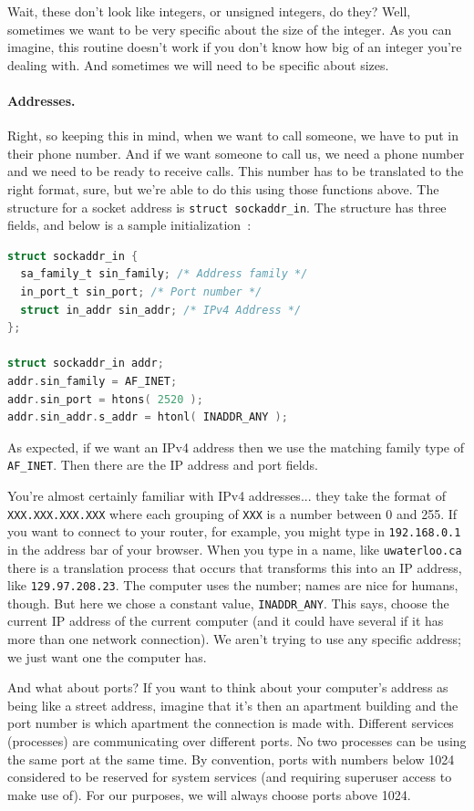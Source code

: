 \documentclass[a4paper]{report}
\begin{document}
Wait, these don't look like integers, or unsigned integers, do they? Well, sometimes we want to be very specific about the size of the integer. As you can imagine, this routine doesn't work if you don't know how big of an integer you're dealing with. And sometimes we will need to be specific about sizes.

\paragraph{Addresses.} Right, so keeping this in mind, when we want to call someone, we have to put in their phone number. And if we want someone to call us, we need a phone number and we need to be ready to receive calls. This number has to be translated to the right format, sure, but we're able to do this using those functions above. The structure for a socket address is \texttt{struct sockaddr\_in}. The structure has three fields, and below is a sample initialization~\cite{apunix}:

\begin{lstlisting}[language=C]
struct sockaddr_in {
  sa_family_t sin_family; /* Address family */
  in_port_t sin_port; /* Port number */
  struct in_addr sin_addr; /* IPv4 Address */
};

struct sockaddr_in addr;
addr.sin_family = AF_INET;
addr.sin_port = htons( 2520 );
addr.sin_addr.s_addr = htonl( INADDR_ANY );
\end{lstlisting}

As expected, if we want an IPv4 address then we use the matching family type of \texttt{AF\_INET}. Then there are the IP address and port fields.

You're almost certainly familiar with IPv4 addresses... they take the format of \texttt{XXX.XXX.XXX.XXX} where each grouping of \texttt{XXX} is a number between 0 and 255. If you want to connect to your router, for example, you might type in \texttt{192.168.0.1} in the address bar of your browser. When you type in a name, like \texttt{uwaterloo.ca} there is a translation process that occurs that transforms this into an IP address, like \texttt{129.97.208.23}. The computer uses the number; names are nice for humans, though. But here we chose a constant value, \texttt{INADDR\_ANY}. This says, choose the current IP address of the current computer (and it could have several if it has more than one network connection). We aren't trying to use any specific address; we just want one the computer has.

And what about ports? If you want to think about your computer's address as being like a street address, imagine that it's then an apartment building and the port number is which apartment the connection is made with. Different services (processes) are communicating over different ports. No two processes can be using the same port at the same time. By convention, ports with numbers below 1024 considered to be reserved for system services (and requiring superuser access to make use of). For our purposes, we will always choose ports above 1024.
\end{document}
